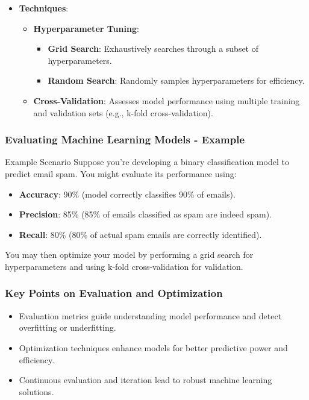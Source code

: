 \documentclass[aspectratio=169]{beamer}
\begin{document}
\begin{frame}[fragile]
\begin{enumerate}
\begin{itemize}
                \item \textbf{Techniques}:
                    \begin{itemize}
                        \item \textbf{Hyperparameter Tuning}:
                            \begin{itemize}
                                \item \textbf{Grid Search}: Exhaustively searches through a subset of hyperparameters.
                                \item \textbf{Random Search}: Randomly samples hyperparameters for efficiency.
                            \end{itemize}
                        \item \textbf{Cross-Validation}: Assesses model performance using multiple training and validation sets (e.g., k-fold cross-validation).
                    \end{itemize}
            \end{itemize}
    \end{enumerate}
\end{frame}

\begin{frame}[fragile]
    \frametitle{Evaluating Machine Learning Models - Example}
    \begin{block}{Example Scenario}
        Suppose you're developing a binary classification model to predict email spam. You might evaluate its performance using:
        \begin{itemize}
            \item \textbf{Accuracy}: 90\% (model correctly classifies 90\% of emails).
            \item \textbf{Precision}: 85\% (85\% of emails classified as spam are indeed spam).
            \item \textbf{Recall}: 80\% (80\% of actual spam emails are correctly identified).
        \end{itemize}
        You may then optimize your model by performing a grid search for hyperparameters and using k-fold cross-validation for validation.
    \end{block}
\end{frame}

\begin{frame}[fragile]
    \frametitle{Key Points on Evaluation and Optimization}
    \begin{itemize}
        \item Evaluation metrics guide understanding model performance and detect overfitting or underfitting.
        \item Optimization techniques enhance models for better predictive power and efficiency.
        \item Continuous evaluation and iteration lead to robust machine learning solutions.
    \end{itemize}
\end{frame}
\end{document}
